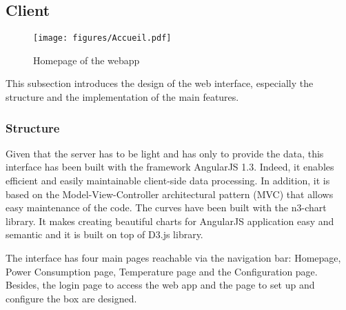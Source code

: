 \subsection{Client} %
\begin{figure}[H]
\centering
\texttt{[image: figures/Accueil.pdf]}
\caption{Homepage of the webapp}
\label{fig:Accueil}
\end{figure}
This subsection introduces the design of the web interface, especially the structure and the implementation of the main features.

\subsubsection{Structure}
    Given that the server has to be light and has only to provide the data, this interface has been built with the framework AngularJS 1.3. Indeed, it enables efficient and easily maintainable client-side data processing. In addition, it is based on the Model-View-Controller architectural pattern (MVC) that allows easy maintenance of the code. The curves have been built with the n3-chart library. It makes creating beautiful charts for AngularJS application easy and semantic and it is built on top of D3.js library.
    
    The interface has four main pages reachable via the navigation bar: Homepage, Power Consumption page, Temperature page and the Configuration page. Besides, the login page to access the web app and the page to set up and configure the box are designed.
     
